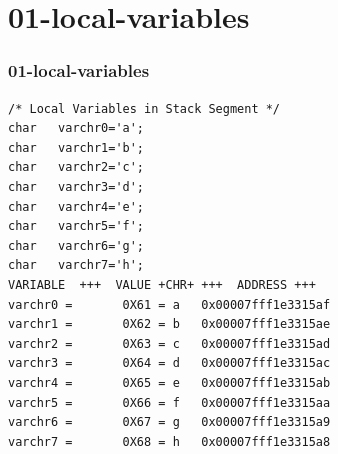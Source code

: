\documentclass[aspectratio=169, xcolor=table, notheorems, hyperref={pdfpagelabels=false}]{beamer}
\begin{document}
\section{01-local-variables}
\begin{frame}[fragile]
\frametitle{01-local-variables}


\begin{lstlisting}[basicstyle=\ttfamily\tiny]
/* Local Variables in Stack Segment */
char   varchr0='a';
char   varchr1='b';
char   varchr2='c';
char   varchr3='d';
char   varchr4='e';
char   varchr5='f';
char   varchr6='g';
char   varchr7='h';
VARIABLE  +++  VALUE +CHR+ +++  ADDRESS +++
varchr0 =       0X61 = a   0x00007fff1e3315af
varchr1 =       0X62 = b   0x00007fff1e3315ae
varchr2 =       0X63 = c   0x00007fff1e3315ad
varchr3 =       0X64 = d   0x00007fff1e3315ac
varchr4 =       0X65 = e   0x00007fff1e3315ab
varchr5 =       0X66 = f   0x00007fff1e3315aa
varchr6 =       0X67 = g   0x00007fff1e3315a9
varchr7 =       0X68 = h   0x00007fff1e3315a8
\end{lstlisting}

\begin{minipage}[t]{120mm}


\end{minipage}

\end{frame}

\end{document}
